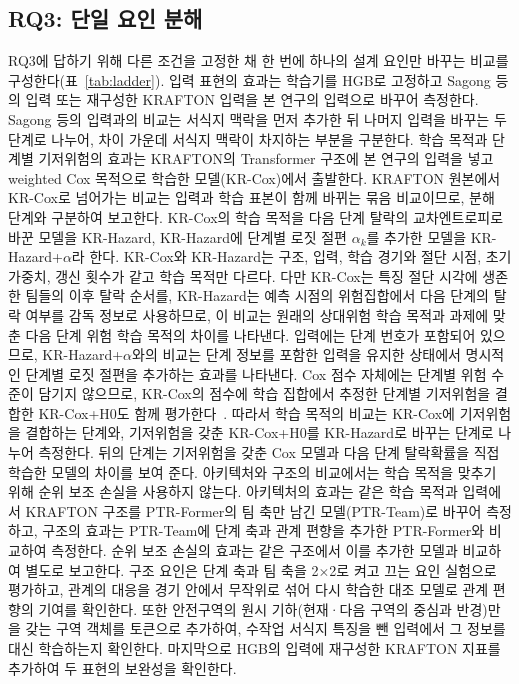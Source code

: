 \subsection{RQ3: 단일 요인 분해}
\label{sec:method:decomposition}

RQ3에 답하기 위해 다른 조건을 고정한 채 한 번에 하나의 설계 요인만 바꾸는 비교를 구성한다(표~\ref{tab:ladder}).
입력 표현의 효과는 학습기를 HGB로 고정하고 Sagong 등의 입력 또는 재구성한 KRAFTON 입력을 본 연구의 입력으로 바꾸어 측정한다.
Sagong 등의 입력과의 비교는 서식지 맥락을 먼저 추가한 뒤 나머지 입력을 바꾸는 두 단계로 나누어, 차이 가운데 서식지 맥락이 차지하는 부분을 구분한다.
학습 목적과 단계별 기저위험의 효과는 KRAFTON의 Transformer 구조에 본 연구의 입력을 넣고 weighted Cox 목적으로 학습한 모델(KR-Cox)에서 출발한다.
KRAFTON 원본에서 KR-Cox로 넘어가는 비교는 입력과 학습 표본이 함께 바뀌는 묶음 비교이므로, 분해 단계와 구분하여 보고한다.
KR-Cox의 학습 목적을 다음 단계 탈락의 교차엔트로피로 바꾼 모델을 KR-Hazard, KR-Hazard에 단계별 로짓 절편 $\alpha_k$를 추가한 모델을 KR-Hazard+$\alpha$라 한다.
KR-Cox와 KR-Hazard는 구조, 입력, 학습 경기와 절단 시점, 초기 가중치, 갱신 횟수가 같고 학습 목적만 다르다.
다만 KR-Cox는 특징 절단 시각에 생존한 팀들의 이후 탈락 순서를, KR-Hazard는 예측 시점의 위험집합에서 다음 단계의 탈락 여부를 감독 정보로 사용하므로, 이 비교는 원래의 상대위험 학습 목적과 과제에 맞춘 다음 단계 위험 학습 목적의 차이를 나타낸다.
입력에는 단계 번호가 포함되어 있으므로, KR-Hazard+$\alpha$와의 비교는 단계 정보를 포함한 입력을 유지한 상태에서 명시적인 단계별 로짓 절편을 추가하는 효과를 나타낸다.
Cox 점수 자체에는 단계별 위험 수준이 담기지 않으므로, KR-Cox의 점수에 학습 집합에서 추정한 단계별 기저위험을 결합한 KR-Cox+H0도 함께 평가한다~\cite{PrenticeGloeckler78}.
따라서 학습 목적의 비교는 KR-Cox에 기저위험을 결합하는 단계와, 기저위험을 갖춘 KR-Cox+H0를 KR-Hazard로 바꾸는 단계로 나누어 측정한다.
뒤의 단계는 기저위험을 갖춘 Cox 모델과 다음 단계 탈락확률을 직접 학습한 모델의 차이를 보여 준다.
아키텍처와 구조의 비교에서는 학습 목적을 맞추기 위해 순위 보조 손실을 사용하지 않는다.
아키텍처의 효과는 같은 학습 목적과 입력에서 KRAFTON 구조를 PTR-Former의 팀 축만 남긴 모델(PTR-Team)로 바꾸어 측정하고, 구조의 효과는 PTR-Team에 단계 축과 관계 편향을 추가한 PTR-Former와 비교하여 측정한다.
순위 보조 손실의 효과는 같은 구조에서 이를 추가한 모델과 비교하여 별도로 보고한다.
구조 요인은 단계 축과 팀 축을 2$\times$2로 켜고 끄는 요인 실험으로 평가하고, 관계의 대응을 경기 안에서 무작위로 섞어 다시 학습한 대조 모델로 관계 편향의 기여를 확인한다.
또한 안전구역의 원시 기하(현재·다음 구역의 중심과 반경)만을 갖는 구역 객체를 토큰으로 추가하여, 수작업 서식지 특징을 뺀 입력에서 그 정보를 대신 학습하는지 확인한다.
마지막으로 HGB의 입력에 재구성한 KRAFTON 지표를 추가하여 두 표현의 보완성을 확인한다.


